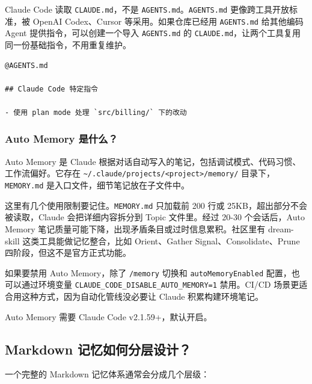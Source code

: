 \documentclass[9pt,a4paper,twocolumn]{ctexart}
\begin{document}
Claude Code 读取 \texttt{CLAUDE.md}，不是 \texttt{AGENTS.md}。\texttt{AGENTS.md} 更像跨工具开放标准，被 OpenAI Codex、Cursor 等采用。如果仓库已经用 \texttt{AGENTS.md} 给其他编码 Agent 提供指令，可以创建一个导入 \texttt{AGENTS.md} 的 \texttt{CLAUDE.md}，让两个工具复用同一份基础指令，不用重复维护。



\begin{lstlisting}
@AGENTS.md

## Claude Code 特定指令

- 使用 plan mode 处理 `src/billing/` 下的改动
\end{lstlisting}



\subsubsection{Auto Memory 是什么？}


Auto Memory 是 Claude 根据对话自动写入的笔记，包括调试模式、代码习惯、工作流偏好。它存在 \texttt{\textasciitilde{}/.claude/projects/<project>/memory/} 目录下，\texttt{MEMORY.md} 是入口文件，细节笔记放在子文件中。



这里有几个使用限制要记住。\texttt{MEMORY.md} 只加载前 200 行或 25KB，超出部分不会被读取，Claude 会把详细内容拆分到 Topic 文件里。经过 20-30 个会话后，Auto Memory 笔记质量可能下降，出现矛盾条目或过时信息累积。社区里有 dream-skill 这类工具能做记忆整合，比如 Orient、Gather Signal、Consolidate、Prune 四阶段，但这不是官方正式功能。



如果要禁用 Auto Memory，除了 \texttt{/memory} 切换和 \texttt{autoMemoryEnabled} 配置，也可以通过环境变量 \texttt{CLAUDE\_CODE\_DISABLE\_AUTO\_MEMORY=1} 禁用。CI/CD 场景更适合用这种方式，因为自动化管线没必要让 Claude 积累构建环境笔记。



Auto Memory 需要 Claude Code v2.1.59+，默认开启。



\subsection*{Markdown 记忆如何分层设计？}


一个完整的 Markdown 记忆体系通常会分成几个层级：
\end{document}
